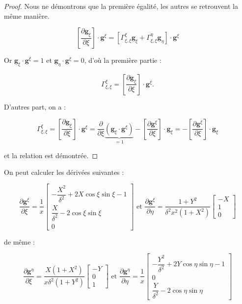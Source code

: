 \begin{proof}
Nous ne démontrons que la première égalité, les autres se retrouvent la même manière.

$$\left[ \dfrac{\partial \mathbf{g}_{\xi}}{\partial \xi} \right] \cdot \mathbf{g}^{\xi} = \left[ \Gamma_{\xi,\xi}^{\xi} \mathbf{g}_{\xi} + \Gamma_{\xi,\xi}^{\eta} \mathbf{g}_{\eta} \right] \cdot \mathbf{g}^{\xi}$$

Or $\mathbf{g}_{\xi} \cdot \mathbf{g}^{\xi} = 1$ et $\mathbf{g}_{\eta} \cdot \mathbf{g}^{\xi} = 0$, d'où la première partie :

$$\Gamma_{\xi,\xi}^{\xi} = \left[ \dfrac{\partial \mathbf{g}_{\xi}}{\partial \xi} \right] \cdot \mathbf{g}^{\xi}.$$

D'autres part, on a :

$$\Gamma_{\xi,\xi}^{\xi} = \left[ \dfrac{\partial \mathbf{g}_{\xi}}{\partial \xi} \right] \cdot \mathbf{g}^{\xi} = \dfrac{\partial}{\partial \xi}  \underbrace{\left(\mathbf{g}_{\xi} \cdot \mathbf{g}^{\xi}\right)}_{=1}  - \left[ \dfrac{\partial \mathbf{g}^{\xi}}{\partial \xi}  \right] \cdot \mathbf{g}_{\xi} = - \left[ \dfrac{\partial \mathbf{g}^{\xi}}{\partial \xi}  \right] \cdot \mathbf{g}_{\xi}$$

et la relation est démontrée.
\end{proof}

On peut calculer les dérivées suivantes :

\begin{equation}
\dfrac{\partial \mathbf{g}^{\xi}}{\partial \xi} = \dfrac{1}{x} \begin{bmatrix}
-\dfrac{X^2}{\delta^2}+2X \cos \xi \sin \xi -1 \\ \dfrac{X}{\delta^2}-2 \cos \xi \sin \xi \\ 0
\end{bmatrix}
\text{ et }
\dfrac{\partial \mathbf{g}^{\xi}}{\partial \eta} = \dfrac{1+Y^2}{\delta^2 x^2 (1+X^2)} \begin{bmatrix}
-X \\ 1 \\ 0
\end{bmatrix}
\end{equation}

de même :

\begin{equation}
\dfrac{\partial \mathbf{g}^{\eta}}{\partial \xi} = \dfrac{X(1+X^2)}{x \delta^2 (1+Y^2)} \begin{bmatrix}
-Y \\ 0 \\ 1
\end{bmatrix}
\text{ et }
\dfrac{\partial \mathbf{g}^{\eta}}{\partial \eta} = \dfrac{1}{x} \begin{bmatrix}
- \dfrac{Y^2}{\delta^2} + 2 Y \cos \eta \sin \eta -1 \\ 0 \\ \dfrac{Y}{\delta^2}- 2 \cos \eta \sin \eta
\end{bmatrix}
\end{equation}

